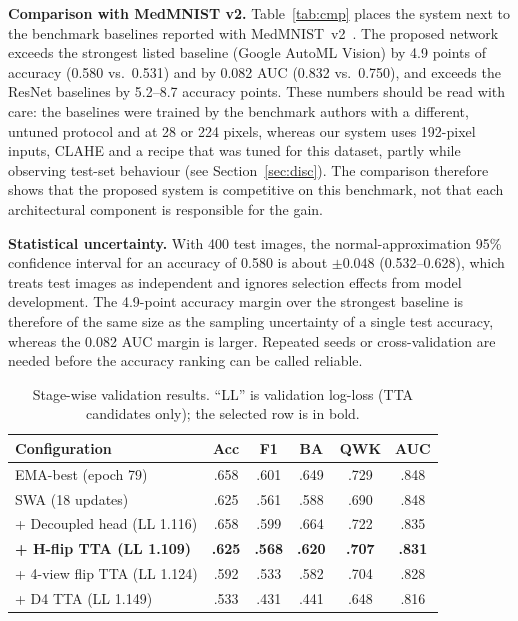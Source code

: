 \documentclass[10pt,twocolumn]{article}
\begin{document}
\textbf{Comparison with MedMNIST v2.} Table~\ref{tab:cmp} places the system next to the benchmark baselines reported with MedMNIST~v2~\cite{medmnistv2}. The proposed network exceeds the strongest listed baseline (Google AutoML Vision) by 4.9 points of accuracy (0.580 vs.\ 0.531) and by 0.082 AUC (0.832 vs.\ 0.750), and exceeds the ResNet baselines by 5.2--8.7 accuracy points. These numbers should be read with care: the baselines were trained by the benchmark authors with a different, untuned protocol and at 28 or 224 pixels, whereas our system uses 192-pixel inputs, CLAHE and a recipe that was tuned for this dataset, partly while observing test-set behaviour (see Section~\ref{sec:disc}). The comparison therefore shows that the proposed system is competitive on this benchmark, not that each architectural component is responsible for the gain.

\textbf{Statistical uncertainty.} With 400 test images, the normal-approximation 95\% confidence interval for an accuracy of 0.580 is about $\pm0.048$ (0.532--0.628), which treats test images as independent and ignores selection effects from model development. The 4.9-point accuracy margin over the strongest baseline is therefore of the same size as the sampling uncertainty of a single test accuracy, whereas the 0.082 AUC margin is larger. Repeated seeds or cross-validation are needed before the accuracy ranking can be called reliable.

\begin{table}[t]
\centering\footnotesize
\caption{Stage-wise validation results. ``LL'' is validation log-loss (TTA candidates only); the selected row is in bold.}\label{tab:stage}
\setlength{\tabcolsep}{3.6pt}
\begin{tabular}{lccccc}
\toprule
Configuration & Acc & F1 & BA & QWK & AUC\\
\midrule
EMA-best (epoch 79) & .658 & .601 & .649 & .729 & .848\\
SWA (18 updates) & .625 & .561 & .588 & .690 & .848\\
+ Decoupled head (LL 1.116) & .658 & .599 & .664 & .722 & .835\\
\textbf{+ H-flip TTA (LL 1.109)} & \textbf{.625} & \textbf{.568} & \textbf{.620} & \textbf{.707} & \textbf{.831}\\
+ 4-view flip TTA (LL 1.124) & .592 & .533 & .582 & .704 & .828\\
+ D4 TTA (LL 1.149) & .533 & .431 & .441 & .648 & .816\\
\bottomrule
\end{tabular}
\end{table}
\end{document}
